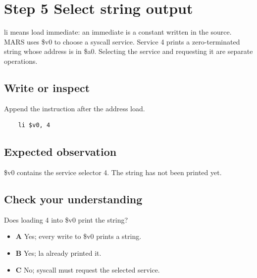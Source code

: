 \section{Step 5 Select string
  output}\label{001-console-calculation-s05-step-5-select-string-output}

li means load immediate: an immediate is a constant written in the
source. MARS uses \$v0 to choose a syscall service. Service 4 prints a
zero-terminated string whose address is in \$a0. Selecting the service
and requesting it are separate operations.

\subsection{Write or
  inspect}\label{001-console-calculation-s05-write-or-inspect}

Append the instruction after the address load.

\begin{verbatim}
    li $v0, 4
\end{verbatim}

\subsection{Expected
  observation}\label{001-console-calculation-s05-expected-observation}

\$v0 contains the service selector 4. The string has not been printed
yet.

\subsection{Check your
  understanding}\label{001-console-calculation-s05-check-your-understanding}

Does loading 4 into \$v0 print the string?

\begin{itemize}
  \tightlist
  \item
        \textbf{A} Yes; every write to \$v0 prints a string.
  \item
        \textbf{B} Yes; la already printed it.
  \item
        \textbf{C} No; syscall must request the selected service.
\end{itemize}
